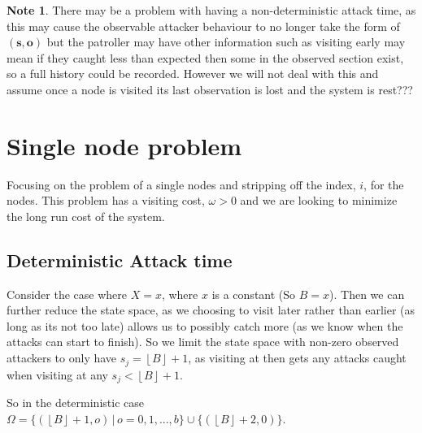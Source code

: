\documentclass[a4paper,10pt]{article}
\newcommand{\floor}[1]{\left \lfloor #1 \right \rfloor}
\theoremstyle{definition}
\theoremstyle{definition}
\theoremstyle{remark}
\theoremstyle{definition}
\newtheorem*{note}{Note}
\begin{document}
\begin{note}
There may be a problem with having a non-deterministic attack time, as this may cause the observable attacker behaviour to no longer take the form of $(\bm{s},\bm{o})$ but the patroller may have other information such as visiting early may mean if they caught less than expected then some in the observed section exist, so a full history could be recorded. However we will not deal with this and assume once a node is visited its last observation is lost and the system is rest???
\end{note}

\section{Single node problem}
Focusing on the problem of a single nodes and stripping off the index, $i$, for the nodes. This problem has a visiting cost, $\omega>0$ and we are looking to minimize the long run cost of the system.

\subsection{Deterministic Attack time}
Consider the case where $X=x$, where $x$ is a constant (So $B=x$). Then we can further reduce the state space, as we choosing to visit later rather than earlier (as long as its not too late) allows us to possibly catch more (as we know when the attacks can start to finish). So we limit the state space with non-zero observed attackers to only have $s_{j}=\floor{B}+1$, as visiting at then gets any attacks caught when visiting at any $s_{j} < \floor{B}+1$.

So in the deterministic case $\Omega= \{(\floor{B}+1,o) \, | \, o=0,1,...,b \} \cup \{(\floor{B}+2,0) \}$.
\end{document}
